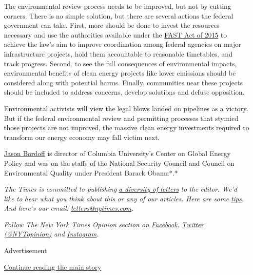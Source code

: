 The environmental review process needs to be improved, but not by
cutting corners. There is no simple solution, but there are several
actions the federal government can take. First, more should be done to
invest the resources necessary and use the authorities available under
the
\href{https://law.stanford.edu/2015/12/10/congress-just-enacted-new-permitting-requirements-for-energy-projects-did-you-miss-it/}{FAST
Act of 2015} to achieve the law's aim to improve coordination among
federal agencies on major infrastructure projects, hold them accountable
to reasonable timetables, and track progress. Second, to see the full
consequences of environmental impacts, environmental benefits of clean
energy projects like lower emissions should be considered along with
potential harms. Finally, communities near these projects should be
included to address concerns, develop solutions and defuse opposition.

Environmental activists will view the legal blows landed on pipelines as
a victory. But if the federal environmental review and permitting
processes that stymied those projects are not improved, the massive
clean energy investments required to transform our energy economy may
fall victim next.

\href{https://sipa.columbia.edu/faculty-research/faculty-directory/jason-bordoff}{Jason
Bordoff} is director of Columbia University's Center on Global Energy
Policy and was on the staffs of the National Security Council and
Council on Environmental Quality under President Barack Obama*.*

\emph{The Times is committed to publishing}
\href{https://www.nytimes.com/2019/01/31/opinion/letters/letters-to-editor-new-york-times-women.html}{\emph{a
diversity of letters}} \emph{to the editor. We'd like to hear what you
think about this or any of our articles. Here are some}
\href{https://help.nytimes.com/hc/en-us/articles/115014925288-How-to-submit-a-letter-to-the-editor}{\emph{tips}}\emph{.
And here's our email:}
\href{mailto:letters@nytimes.com}{\emph{letters@nytimes.com}}\emph{.}

\emph{Follow The New York Times Opinion section on}
\href{https://www.facebook.com/nytopinion}{\emph{Facebook}}\emph{,}
\href{http://twitter.com/NYTOpinion}{\emph{Twitter (@NYTopinion)}}
\emph{and}
\href{https://www.instagram.com/nytopinion/}{\emph{Instagram}}\emph{.}

Advertisement

\protect\hyperlink{after-bottom}{Continue reading the main story}

